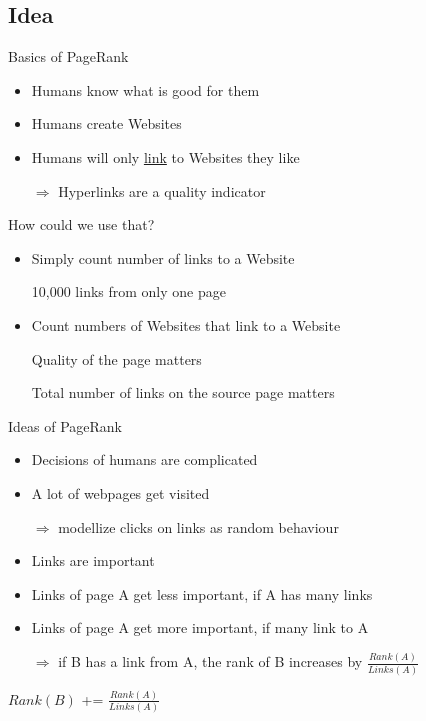 \subsection{Idea}
\begin{frame}{Basics of PageRank}
    \begin{itemize}[<+->]
        \item Humans know what is good for them
        \item Humans create Websites
        \item Humans will only \href{http://en.wikipedia.org/wiki/Hyperlink}{link} to Websites they like
        \item[$\Rightarrow$] Hyperlinks are a quality indicator
    \end{itemize}
\end{frame}

\begin{frame}{How could we use that?}
    \begin{itemize}[<+->]
        \item Simply count number of links to a Website
        \item[\xmark] 10,000 links from only one page
        \item Count numbers of Websites that link to a Website
        \item[\xmark] Quality of the page matters
        \item[\xmark] Total number of links on the source page matters
    \end{itemize}
\end{frame}


\begin{frame}{Ideas of PageRank}
    \begin{itemize}[<+->]
        \item Decisions of humans are complicated
        \item A lot of webpages get visited
        \item[$\Rightarrow$] modellize clicks on links as random behaviour
        \item Links are important
        \item Links of page A get less important, if A has many links
        \item Links of page A get more important, if many link to A
        \item[$\Rightarrow$] if B has a link from A, the rank of B increases by $\frac{Rank(A)}{Links(A)}$
    \end{itemize}

    \pause[\thebeamerpauses]

    \begin{algorithmic}
            \State $Rank(B)$ += $\frac{Rank(A)}{Links(A)}$
        \EndIf
    \end{algorithmic}
\end{frame}

